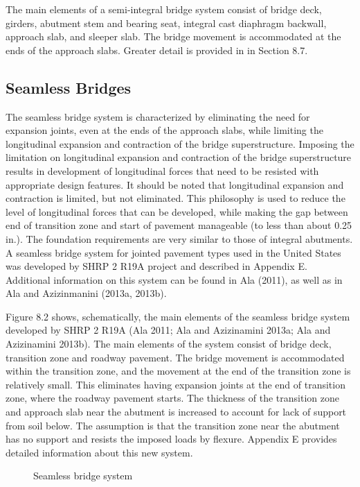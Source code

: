 The main elements of a semi-integral bridge system consist of bridge deck, girders, abutment stem and bearing
seat, integral cast diaphragm backwall, approach slab, and sleeper slab. The bridge movement is accommodated at the
ends of the approach slabs. Greater detail is provided in in Section 8.7.


\subsection{Seamless Bridges}
The seamless bridge system is characterized by eliminating the need for expansion joints, even at the ends of the
approach slabs, while limiting the longitudinal expansion and contraction of the bridge superstructure. Imposing the
limitation on longitudinal expansion and contraction of the bridge superstructure results in development of
longitudinal forces that need to be resisted with appropriate design features. It should be noted that longitudinal
expansion and contraction is limited, but not eliminated. This philosophy is used to reduce the level of longitudinal
forces that can be developed, while making the gap between end of transition zone and start of pavement manageable
(to less than about 0.25 in.). The foundation requirements are very similar to those of integral abutments. A seamless
bridge system for jointed pavement types used in the United States was developed by SHRP 2 R19A project and
described in Appendix E. Additional information on this system can be found in Ala (2011), as well as in Ala and
Azizinmanini (2013a, 2013b).

Figure 8.2 shows, schematically, the main elements of the seamless bridge system developed by SHRP 2 R19A
(Ala 2011; Ala and Azizinamini 2013a; Ala and Azizinamini 2013b). The main elements of the system consist of
bridge deck, transition zone and roadway pavement. The bridge movement is accommodated within the transition
zone, and the movement at the end of the transition zone is relatively small. This eliminates having expansion joints at
the end of transition zone, where the roadway pavement starts. The thickness of the transition zone and approach slab
near the abutment is increased to account for lack of support from soil below. The assumption is that the transition zone near the abutment has no support and resists the imposed loads by flexure. Appendix E provides detailed
information about this new system.

\begin{figure}
  \caption{Seamless bridge system}\label{fig:seamless-bridge}
\end{figure}

